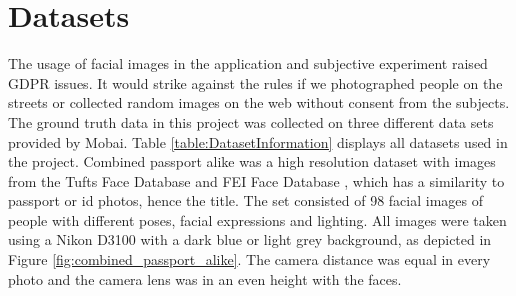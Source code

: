 \section{Datasets}
\label{sec:datasets}
The usage of facial images in the application and subjective experiment raised GDPR issues. It would strike against the rules if we photographed people on the streets or collected random images on the web without consent from the subjects. The ground truth data in this project was collected on three different data sets provided by Mobai. Table \ref{table:DatasetInformation} displays all datasets used in the project. Combined passport alike was a high resolution dataset with images from the Tufts Face Database \cite{Tufts-Face-Database} and FEI Face Database \cite{FEI-Face-Database}, which has a similarity to passport or id photos, hence the title. The set consisted of 98 facial images of people with different poses, facial expressions and lighting. All images were taken using a Nikon D3100 with a dark blue or light grey background, as depicted in Figure \ref{fig:combined_passport_alike}. The camera distance was equal in every photo and the camera lens was in an even height with the faces. 

